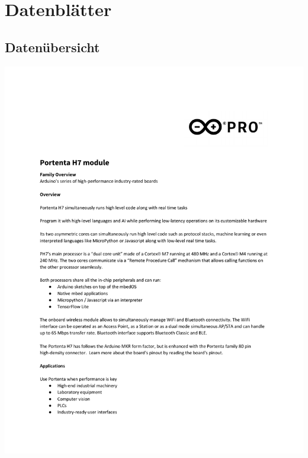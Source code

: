 %
%


\chapter{Datenblätter}

\section{Datenübersicht}


\setcounter{mycounter}{1}

{
	\includegraphics[width=1\textwidth,page=\themycounter]{../../MLbib/Arduino/PortentaH7/PORTENTA_H7_PRODUCT_DESCRIPTION.pdf}
	\newpage
}



